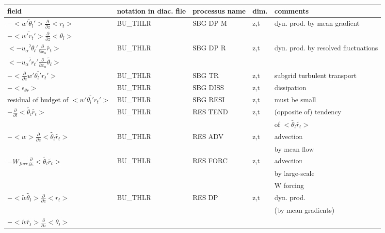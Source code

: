 \begin{center}
\begin{tabular}{||p{5cm}|>{\centering}p{2cm}|>{\centering}p{2.5cm}|>{\centering}p{0.5cm}|p{5.5cm }||}
\hline
\hline
field & notation in diac. file& processus name& dim.  & comments \\
\hline
\hline
$-<\overline{w'\theta_l'}>\frac{\partial }{\partial z}<r_t>$ & BU\_THLR & SBG DP M & z,t & dyn. prod. by mean gradient \\
$-<\overline{w'r_t'}>\frac{\partial }{\partial z}<\theta_l>$ & & & & \\
\hline
$<-\overline{u_\alpha'\theta_l'}\frac{\partial}{\partial x_\alpha}\tilde{r_t}>$ & BU\_THLR & SBG DP R & z,t & dyn. prod. by resolved fluctuations\\
$<-\overline{u_\alpha'r_t'}\frac{\partial}{\partial x_\alpha}\tilde{\theta_l}>$ &  & && \\
\hline
$-<\frac{\partial}{\partial z}\overline{w'\theta_l'r_t'}>$ & BU\_THLR & SBG TR   & z,t & subgrid turbulent transport\\
\hline
$-<\epsilon_{\theta r}>$ & BU\_THLR & SBG DISS & z,t & dissipation \\
\hline
{\rm residual of budget of} $<\overline{w'\theta_l'r_t'}>$ & BU\_THLR & SBG RESI & z,t & must be small \\
\hline
$-\frac{\partial }{\partial t}<\tilde{\theta_l}\tilde{r_t}>$ & BU\_THLR & RES TEND & z,t & (opposite of) tendency\\
 & & & &of $<\tilde{\theta_l}\tilde{r_t}>$\\
\hline
$-<w>\frac{\partial}{\partial z}<\tilde{\theta_l}\tilde{r_t}>$ & BU\_THLR & RES ADV  & z,t & advection \\
 & & & & by mean flow\\
\hline
$-W_{forc}\frac{\partial}{\partial z}<\tilde{\theta_l}\tilde{r_t}>$ & BU\_THLR & RES FORC & z,t & advection \\
 & & & & by large-scale\\
 & & & & W forcing\\
\hline
$-<\tilde{w}\tilde{\theta_l}>\frac{\partial }{\partial z}<r_t>$ & BU\_THLR & RES DP   & z,t & dyn. prod.\\
 & & & &(by mean gradients) \\
$-<\tilde{w}\tilde{r_t}>\frac{\partial }{\partial z}<\theta_l>$ &  &  & & \\
\hline
\hline
\end{tabular}
\end{center}


